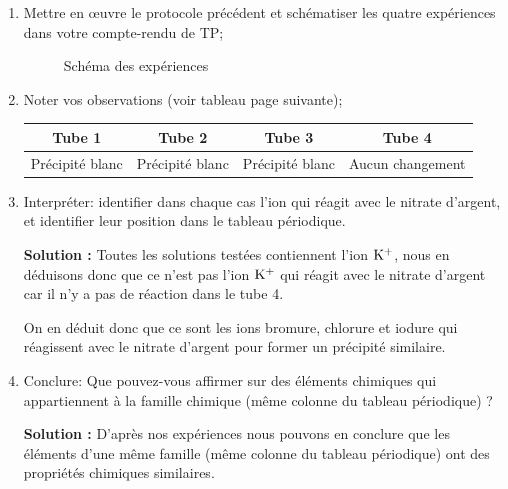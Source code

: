 \documentclass[french]{article}
\begin{document}
\begin{enumerate}
	\item Mettre en \oe uvre le protocole précédent et schématiser les quatre expériences dans votre compte-rendu de TP;
	

\begin{figure}[ht]
	\centering
	\pstTubeEssais[etiquette,Numero={\small K$^{+}+$Br$^{-}$},solide=\pstGrenailleZinc, aspectLiquide1 = Eau]
	\pstTubeEssais[etiquette,Numero={\small K$^{+}+$Cl$^{-}$},solide=\pstGrenailleZinc, aspectLiquide1 = Eau]
	\pstTubeEssais[etiquette,Numero={\small K$^{+}+$I$^{-}$},solide=\pstGrenailleZinc, aspectLiquide1 = Eau]
	\pstTubeEssais[etiquette,Numero={\small K$^{+}+$$\rm NO_3^{-}$}, aspectLiquide1 = Eau]
	
	\caption{Schéma des expériences}
\end{figure}

	\item Noter vos observations (voir tableau page suivante);
	\begin{table}[ht]
		\centering
		\begin{tabular}{|c|c|c|c|}
			\hline
			\textbf{Tube 1} & \textbf{Tube 2} & \textbf{Tube 3} & \textbf{Tube 4} \\ \hline
			Précipité blanc & Précipité blanc & Précipité blanc & Aucun changement \\ \hline
		\end{tabular}
	\end{table}
	\item Interpréter: identifier dans chaque cas l'ion qui réagit avec le nitrate d'argent, et identifier leur position dans le tableau périodique. 
	
	\textbf{Solution :} Toutes les solutions testées contiennent l'ion $\rm K^{+}$, nous en déduisons donc que ce n'est pas l'ion $\rm K^{+}$ qui réagit avec le nitrate d'argent car il n'y a pas de réaction dans le tube 4. 

	On en déduit donc que ce sont les ions bromure, chlorure et iodure qui réagissent avec le nitrate d'argent pour former un précipité similaire.

	\item Conclure: Que pouvez-vous affirmer sur des éléments chimiques qui appartiennent à la famille chimique (même colonne du tableau périodique) ?
	
	\textbf{Solution :} D'après nos expériences nous pouvons en conclure que les éléments d'une même famille (même colonne du tableau périodique) ont des propriétés chimiques similaires.
\end{enumerate}
\end{document}
